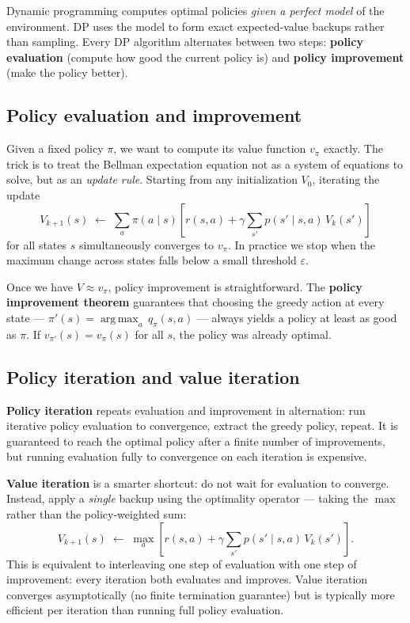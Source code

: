 \documentclass[11pt, oneside]{book}
\newcommand{\argmax}{\operatorname*{arg\,max}}
\newcommand{\vpi}{v_{\pi}}               %
\begin{document}
Dynamic programming computes optimal policies \emph{given a perfect model} of
the environment.
DP uses the model to form exact expected-value backups rather than sampling.
Every DP algorithm alternates between two steps:
\textbf{policy evaluation} (compute how good the current policy is) and
\textbf{policy improvement} (make the policy better).

\subsection{Policy evaluation and improvement}

Given a fixed policy $\pi$, we want to compute its value function $\vpi$
exactly.
The trick is to treat the Bellman expectation equation not as a system of
equations to solve, but as an \emph{update rule}.
Starting from any initialization $V_0$, iterating the update
\[
  V_{k+1}(s) \;\leftarrow\; \sum_a \pi(a\mid s)\!\left[r(s,a)
    + \gamma\sum_{s'}p(s'\mid s,a)\,V_k(s')\right]
\]
for all states $s$ simultaneously converges to $\vpi$.
In practice we stop when the maximum change across states falls below a small
threshold $\varepsilon$.

Once we have $V \approx \vpi$, policy improvement is straightforward.
The \textbf{policy improvement theorem} guarantees that choosing the greedy
action at every state --- $\pi'(s) = \argmax_a\,q_\pi(s,a)$ --- always yields
a policy at least as good as $\pi$.
If $v_{\pi'}(s) = \vpi(s)$ for all $s$, the policy was already optimal.

\subsection{Policy iteration and value iteration}

\textbf{Policy iteration} repeats evaluation and improvement in alternation:
run iterative policy evaluation to convergence, extract the greedy policy,
repeat.
It is guaranteed to reach the optimal policy after a finite number of
improvements, but running evaluation fully to convergence on each iteration
is expensive.

\textbf{Value iteration} is a smarter shortcut: do not wait for evaluation to
converge.
Instead, apply a \emph{single} backup using the optimality operator --- taking
the $\max$ rather than the policy-weighted sum:
\[
  V_{k+1}(s) \;\leftarrow\; \max_a\!\left[r(s,a)
    + \gamma\sum_{s'} p(s'\mid s,a)\,V_k(s')\right].
\]
This is equivalent to interleaving one step of evaluation with one step of
improvement: every iteration both evaluates and improves.
Value iteration converges asymptotically (no finite termination guarantee) but is
typically more efficient per iteration than running full policy evaluation.
\end{document}
